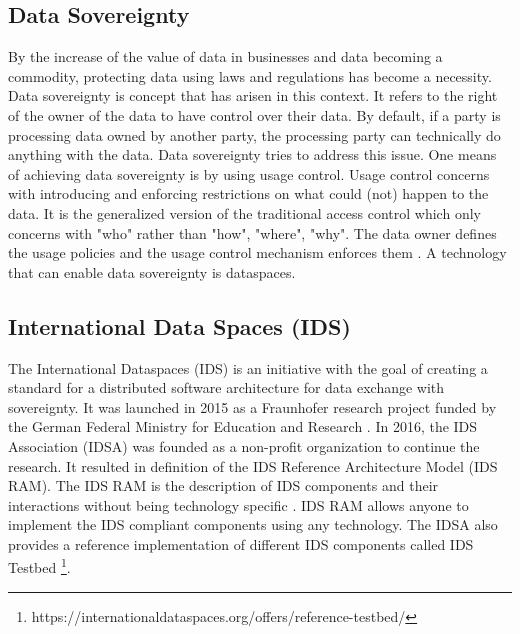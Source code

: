 \noindent{}

\subsection{Data Sovereignty}
By the increase of the value of data in businesses and data becoming a commodity, protecting data using laws and regulations has become a necessity. Data sovereignty is concept that has arisen in this context. It refers to the right of the owner of the data to have control over their data. By default, if a party is processing data owned by another party, the processing party can technically do anything with the data. Data sovereignty tries to address this issue. One means of achieving data sovereignty is by using usage control. Usage control concerns with introducing and enforcing restrictions on what could (not) happen to the data. It is the generalized version of the traditional access control which only concerns with "who" rather than "how", "where", "why". The data owner defines the usage policies and the usage control mechanism enforces them \cite{eitel_usage_2021}. A technology that can enable data sovereignty is dataspaces.

\subsection{International Data Spaces (IDS)}
The International Dataspaces (IDS) is an initiative with the goal of creating a standard for a distributed software architecture for data exchange with sovereignty. It was launched in 2015 as a Fraunhofer research project funded by the German Federal Ministry for Education and Research \cite{otto_evolution_2022}. In 2016, the IDS Association (IDSA) was founded as a non-profit organization to continue the research. It resulted in definition of the IDS Reference Architecture Model (IDS RAM). The IDS RAM is the description of IDS components and their interactions without being technology specific \cite{otto_evolution_2022}. IDS RAM allows anyone to implement the IDS compliant components using any technology. The IDSA also provides a reference implementation of different IDS components called IDS Testbed \footnote{https://internationaldataspaces.org/offers/reference-testbed/}. 

